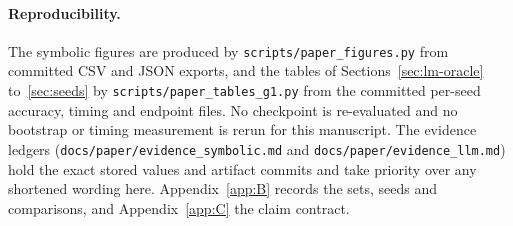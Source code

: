 \paragraph{Reproducibility.}
The symbolic figures are produced by \texttt{scripts/paper\_figures.py} from committed CSV and JSON exports, and the tables of Sections~\ref{sec:lm-oracle} to~\ref{sec:seeds} by \texttt{scripts/paper\_tables\_g1.py} from the committed per-seed accuracy, timing and endpoint files.
No checkpoint is re-evaluated and no bootstrap or timing measurement is rerun for this manuscript.
The evidence ledgers (\texttt{docs/paper/evidence\_symbolic.md} and \texttt{docs/paper/evidence\_llm.md}) hold the exact stored values and artifact commits and take priority over any shortened wording here.
Appendix~\ref{app:B} records the sets, seeds and comparisons, and Appendix~\ref{app:C} the claim contract.
